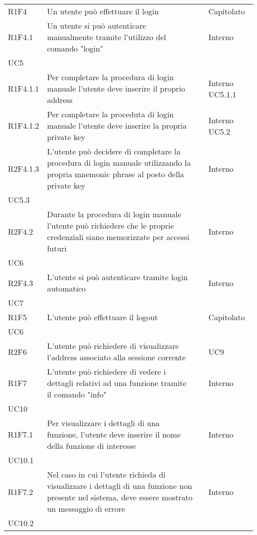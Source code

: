 \begin{longtable}{ 
		>{\centering}p{} 
		>{}p{} 
		>{\centering}p{}
		>{\centering}p{} }
	R1F4 & Un utente può effettuare il login 										& \ob & Capitolato \tabularnewline
	R1F4.1 & Un utente si può autenticare manualmente tramite l'utilizzo 
			del comando "login" 													& \ob & Interno \\ UC5 \tabularnewline
	R1F4.1.1 & Per completare la procedura di login manuale l'utente deve inserire
			 il proprio address														& \ob & Interno UC5.1.1 \tabularnewline
	R1F4.1.2 & Per completare la proceduta di login manuale l'utente deve inserire
			 la propria private key 												& \ob & Interno UC5.2 \tabularnewline
	R2F4.1.3 & L'utente può decidere di completare la procedura di login manuale 
			 utilizzando la propria mnemonic phrase al posto della private key		& \de & Interno \\ UC5.3 \tabularnewline
	R2F4.2 & Durante la procedura di login manuale l'utente può richiedere che
			 le proprie credenziali siano memorizzate per accessi futuri 			& \de & Interno \\ UC6 \tabularnewline
	R2F4.3 & L'utente si può autenticare tramite login automatico 					& \de & Interno \\ UC7 \tabularnewline
	
	R1F5 & L'utente può effettuare il logout 										& \ob & Capitolato \\ UC6 \tabularnewline 
	
	R2F6 & L'utente può richiedere di visualizzare l'address 
			associato alla sessione corrente 										& \de & UC9 \tabularnewline
	
	R1F7 & L'utente può richiedere di vedere i dettagli relativi ad una funzione
		tramite il comando "info"													& \ob & Interno \\ UC10 \tabularnewline
	R1F7.1 & Per visualizzare i dettagli di una funzione, l'utente deve inserire 
		il nome della funzione di interesse											& \ob & Interno \\ UC10.1 \tabularnewline
	R1F7.2 & Nel caso in cui l'utente richieda di visualizzare i dettagli di una 
		funzione non presente nel sistema, deve essere mostrato un messaggio di
		errore															 			& \ob & Interno \\ UC10.2 \tabularnewline
	

\end{longtable}
